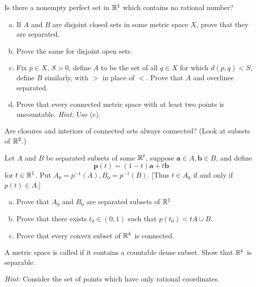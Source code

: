 \begin{myExercise}
    \label{ex:2.18}
    Is there a nonempty perfect set in ${\protect\mathbb R}^1$ which contains no rational number?
\end{myExercise}


\begin{myExercise}
    \label{ex:2.19}
    \begin{enumerate}[(a)]
        \item If $A$ and $B$ are disjoint closed sets in some metric space $X$, prove that they are separated.
        \item Prove the same for disjoint open sets. 
        \item Fix $p \in X$, $S > 0$, define $A$ to be the set of all $q \in X$ for which $d(p, q) < S$, define $B$ similarly, with $>$ in place of $<$. Prove that $A$ and overlinee separated.
        \item Prove that every connected metric space with at least two points is uncountable. \emph{Hint:} Use (c).
    \end{enumerate}
\end{myExercise}

\begin{myExercise}
    \label{ex:2.20}
    Are closures and interiors of connected sets always connected? 
    (Look at subsets of ${\protect\mathbb R}^2$.)
\end{myExercise}

\begin{myExercise}
    \label{ex:2.21}
    Let $A$ and $B$ be separated subsets of some ${\protect\mathbb R}^t$, 
    suppose $\mathbf{a} \in A, \mathbf{b} \in B$,
    and define 
    \begin{equation*}
        \mathbf{p}(t) = (1 - t)\mathbf{a} + t\mathbf{b}
    \end{equation*}
    for $t \in {\protect\mathbb R}^1$. 
    Put $A_0= p^{-1}(A), B_0= p^{-1}(B)$. 
    [Thus $t \in A_0$ if and only if $p(t) \in A$.]
    \begin{enumerate}[(a)]
        \item Prove that $A_0$ and $B_0$ are separated subsets of ${\protect\mathbb R}^1$
        \item Prove that there exists $t_0 \in (0, 1)$ such that $p(t_0) <t A \cup B$.
        \item Prove that every convex subset of ${\protect\mathbb R}^k$ is connected.
    \end{enumerate}
\end{myExercise}

\begin{myExercise}
    \label{ex:2.22}
    A metric space is called  if it contains a countable dense subset. 
    Show that ${\protect\mathbb R}^k$ is separable. 
    
    \emph{Hint:} Consider the set of points which have only rational coordinates.
\end{myExercise}

